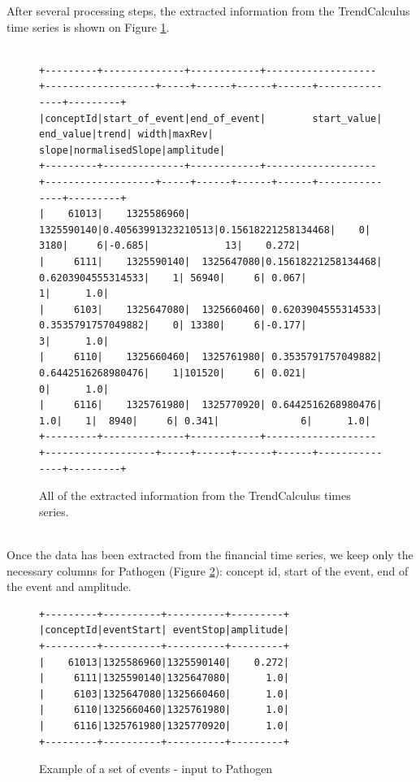 \documentclass[a4, 11pt]{article}
\begin{document}
After several processing steps, the extracted information from the TrendCalculus time series is shown on Figure \ref{fig:data}.
\begin{figure}[!ht]
    \begin{BVerbatim}[baselinestretch=0.1,fontsize=\fontsize{6.8}{0}\selectfont]
   
+---------+--------------+------------+-------------------+-------------------+-----+------+------+------+---------------+---------+
|conceptId|start_of_event|end_of_event|        start_value|          end_value|trend| width|maxRev| slope|normalisedSlope|amplitude|
+---------+--------------+------------+-------------------+-------------------+-----+------+------+------+---------------+---------+
|    61013|    1325586960|  1325590140|0.40563991323210513|0.15618221258134468|    0|  3180|     6|-0.685|             13|    0.272|
|     6111|    1325590140|  1325647080|0.15618221258134468| 0.6203904555314533|    1| 56940|     6| 0.067|              1|      1.0|
|     6103|    1325647080|  1325660460| 0.6203904555314533| 0.3535791757049882|    0| 13380|     6|-0.177|              3|      1.0|
|     6110|    1325660460|  1325761980| 0.3535791757049882| 0.6442516268980476|    1|101520|     6| 0.021|              0|      1.0|
|     6116|    1325761980|  1325770920| 0.6442516268980476|                1.0|    1|  8940|     6| 0.341|              6|      1.0|
+---------+--------------+------------+-------------------+-------------------+-----+------+------+------+---------------+---------+
\end{BVerbatim}
    \caption{All of the extracted information from the TrendCalculus times series.}
    \label{fig:data}
\end{figure}
\\Once the data has been extracted from the financial time series, we keep only the necessary columns for Pathogen (Figure \ref{fig:data_pathogen}): concept id, start of the event, end of the event and amplitude.
\begin{figure}[!ht]
\centering
    \begin{BVerbatim}[baselinestretch=0.1,fontsize=\fontsize{12}{0}\selectfont]
+---------+----------+----------+---------+
|conceptId|eventStart| eventStop|amplitude|
+---------+----------+----------+---------+
|    61013|1325586960|1325590140|    0.272|
|     6111|1325590140|1325647080|      1.0|
|     6103|1325647080|1325660460|      1.0|
|     6110|1325660460|1325761980|      1.0|
|     6116|1325761980|1325770920|      1.0|
+---------+----------+----------+---------+
    \end{BVerbatim}
    \caption{Example of a set of events - input to Pathogen}
    \label{fig:data_pathogen}
\end{figure}
\end{document}
